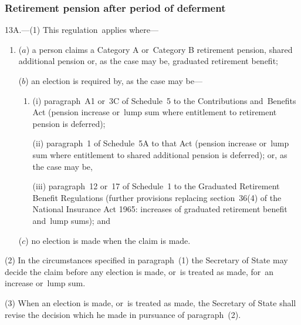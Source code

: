 \documentclass[12pt,a4paper]{article}
\begin{document}

\subsubsection[13A. Retirement pension after period of deferment]{Retirement pension after period of deferment}

13A.---(1)  This regulation~applies where—
\begin{enumerate}\item[]
($a$) a person claims a Category A or~Category B retirement pension, shared additional pension or, as the case may be, graduated retirement benefit;

($b$) an election is required by, as the case may be—
\begin{enumerate}\item[]
(i) paragraph~A1 or~3C of Schedule~5 to the Contributions and~Benefits Act (pension increase or~lump sum where entitlement to retirement pension is deferred);

(ii) paragraph~1 of Schedule~5A to that Act (pension increase or~lump sum where entitlement to shared additional pension is deferred); or, as the case may be,

(iii) paragraph~12 or~17 of Schedule~1 to the Graduated Retirement Benefit Regulations (further provisions replacing section~36(4) of the National Insurance Act 1965: increases of graduated retirement benefit and~lump sums); and 
\end{enumerate}

($c$) no election is made when the claim is made.
\end{enumerate}

(2) In the circumstances specified in paragraph~(1) the Secretary of State may decide the claim before any election is made, or~is treated as made, for~an increase or~lump sum.

(3) When an election is made, or~is treated as made, the Secretary of State shall revise the decision which he made in pursuance of paragraph~(2).
\end{document}
